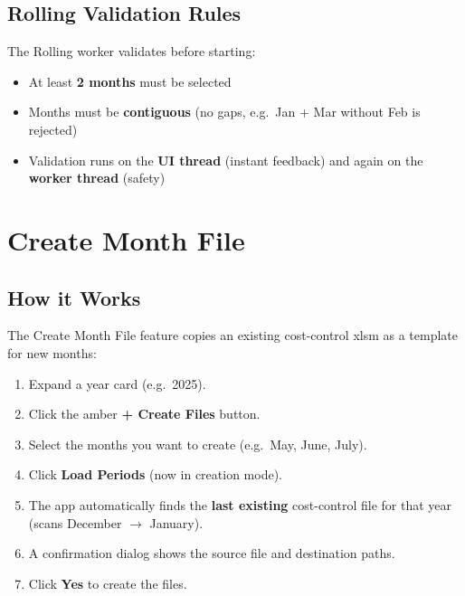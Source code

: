 \documentclass[11pt,a4paper]{article}
\begin{document}
\subsection{Rolling Validation Rules}

The Rolling worker validates before starting:

\begin{itemize}[leftmargin=*, itemsep=4pt]
\item At least \textbf{2 months} must be selected
\item Months must be \textbf{contiguous} (no gaps, e.g.\ Jan + Mar without Feb is rejected)
\item Validation runs on the \textbf{UI thread} (instant feedback) and again on the \textbf{worker thread} (safety)
\end{itemize}

\section{Create Month File}
\label{sec:createmonth}

\subsection{How it Works}

The Create Month File feature copies an existing cost-control xlsm as a template for new months:

\begin{stepbox}
\begin{enumerate}[leftmargin=*, itemsep=6pt]
\item Expand a year card (e.g.\ 2025).
\item Click the amber \textbf{+ Create Files} button.
\item Select the months you want to create (e.g.\ May, June, July).
\item Click \textbf{Load Periods} (now in creation mode).
\item The app automatically finds the \textbf{last existing} cost-control file for that year (scans December $\rightarrow$ January).
\item A confirmation dialog shows the source file and destination paths.
\item Click \textbf{Yes} to create the files.
\end{enumerate}
\end{stepbox}
\end{document}
